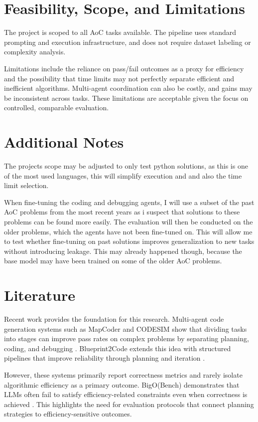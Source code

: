 \documentclass{article}
\begin{document}
\section{Feasibility, Scope, and Limitations}

The project is scoped to all AoC tasks available. The pipeline uses standard prompting and execution infrastructure, and does not require dataset labeling or complexity analysis.

Limitations include the reliance on pass/fail outcomes as a proxy for efficiency and the possibility that time limits may not perfectly separate efficient and inefficient algorithms. Multi-agent coordination can also be costly, and gains may be inconsistent across tasks. These limitations are acceptable given the focus on controlled, comparable evaluation.

\section{Additional Notes}

The projects scope may be adjusted to only test python solutions, as this is one of the most used languages, this will simplify execution and and also the time limit selection.

When fine-tuning the coding and debugging agents, I will use a subset of the past AoC problems from the most recent years as i suspect that solutions to these problems can be found more easily.
The evaluation will then be conducted on the older problems, which the agents have not been fine-tuned on. This will allow me to test whether fine-tuning on past solutions improves generalization to new tasks without introducing leakage.
This may already happened though, because the base model may have been trained on some of the older AoC problems.

\section{Literature}

Recent work provides the foundation for this research. Multi-agent code generation systems such as MapCoder and CODESIM show that dividing tasks into stages can improve pass rates on complex problems by separating planning, coding, and debugging \cite{islam2024,islam2025}. Blueprint2Code extends this idea with structured pipelines that improve reliability through planning and iteration \cite{mao2025}.

However, these systems primarily report correctness metrics and rarely isolate algorithmic efficiency as a primary outcome. BigO(Bench) demonstrates that LLMs often fail to satisfy efficiency-related constraints even when correctness is achieved \cite{chambon2025}. This highlights the need for evaluation protocols that connect planning strategies to efficiency-sensitive outcomes.
\end{document}
